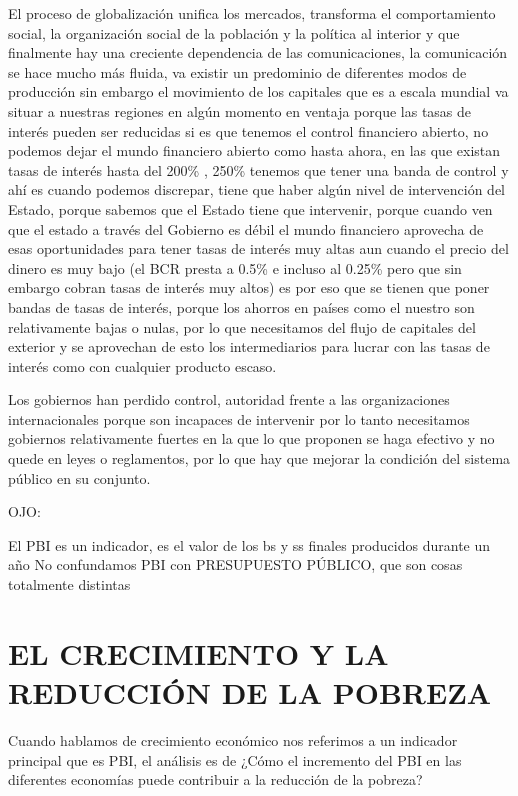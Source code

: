 \documentclass[
  a4paper,
]{article}
\begin{document}
El proceso de globalización unifica los mercados, transforma el
comportamiento social, la organización social de la población y la
política al interior y que finalmente hay una creciente dependencia de
las comunicaciones, la comunicación se hace mucho más fluida, va existir
un predominio de diferentes modos de producción sin embargo el
movimiento de los capitales que es a escala mundial va situar a nuestras
regiones en algún momento en ventaja porque las tasas de interés pueden
ser reducidas si es que tenemos el control financiero abierto, no
podemos dejar el mundo financiero abierto como hasta ahora, en las que
existan tasas de interés hasta del 200\% , 250\% tenemos que tener una
banda de control y ahí es cuando podemos discrepar, tiene que haber
algún nivel de intervención del Estado, porque sabemos que el Estado
tiene que intervenir, porque cuando ven que el estado a través del
Gobierno es débil el mundo financiero aprovecha de esas oportunidades
para tener tasas de interés muy altas aun cuando el precio del dinero es
muy bajo (el BCR presta a 0.5\% e incluso al 0.25\% pero que sin embargo
cobran tasas de interés muy altos) es por eso que se tienen que poner
bandas de tasas de interés, porque los ahorros en países como el nuestro
son relativamente bajas o nulas, por lo que necesitamos del flujo de
capitales del exterior y se aprovechan de esto los intermediarios para
lucrar con las tasas de interés como con cualquier producto escaso.

Los gobiernos han perdido control, autoridad frente a las organizaciones
internacionales porque son incapaces de intervenir por lo tanto
necesitamos gobiernos relativamente fuertes en la que lo que proponen se
haga efectivo y no quede en leyes o reglamentos, por lo que hay que
mejorar la condición del sistema público en su conjunto.

OJO:

El PBI es un indicador, es el valor de los bs y ss finales producidos
durante un año No confundamos PBI con PRESUPUESTO PÚBLICO, que son cosas
totalmente distintas

\hypertarget{el-crecimiento-y-la-reducciuxf3n-de-la-pobreza}{%
\section{EL CRECIMIENTO Y LA REDUCCIÓN DE LA
POBREZA}\label{el-crecimiento-y-la-reducciuxf3n-de-la-pobreza}}

Cuando hablamos de crecimiento económico nos referimos a un indicador
principal que es PBI, el análisis es de ¿Cómo el incremento del PBI en
las diferentes economías puede contribuir a la reducción de la pobreza?
\end{document}

